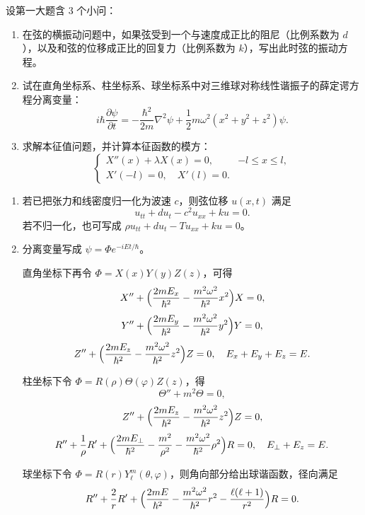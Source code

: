 ﻿

\begin{question}[简单计算和回答]

设第一大题含 3 个小问：
\begin{enumerate}[label=(\arabic*),leftmargin=2.6em,itemsep=0.25em,topsep=0.2em]
\item 在弦的横振动问题中，如果弦受到一个与速度成正比的阻尼（比例系数为 $d$），以及和弦的位移成正比的回复力（比例系数为 $k$），写出此时弦的振动方程。
\item 试在直角坐标系、柱坐标系、球坐标系中对三维球对称线性谐振子的薛定谔方程分离变量：
\[
 i\hbar\frac{\partial \psi}{\partial t}=-\frac{\hbar^2}{2m}\nabla^2\psi+\frac12 m\omega^2(x^2+y^2+z^2)\psi.
\]
\item 求解本征值问题，并计算本征函数的模方：
\[
\begin{cases}
X''(x)+\lambda X(x)=0, & -l\le x\le l,\\
X'(-l)=0,\quad X'(l)=0.
\end{cases}
\]
\end{enumerate}

\begin{solution}

\begin{enumerate}[label=(\arabic*),leftmargin=2.6em,itemsep=0.25em,topsep=0.2em]
\item 若已把张力和线密度归一化为波速 $c$，则弦位移 $u(x,t)$ 满足
\[
 u_{tt}+d u_t-c^2u_{xx}+ku=0.
\]
若不归一化，也可写成 $\rho u_{tt}+d u_t-Tu_{xx}+ku=0$。

\item 分离变量写成 $\psi=\Phi e^{-iEt/\hbar}$。

直角坐标下再令 $\Phi=X(x)Y(y)Z(z)$，可得
\[
X''+\Bigl(\frac{2mE_x}{\hbar^2}-\frac{m^2\omega^2}{\hbar^2}x^2\Bigr)X=0,
\]
\[
Y''+\Bigl(\frac{2mE_y}{\hbar^2}-\frac{m^2\omega^2}{\hbar^2}y^2\Bigr)Y=0,
\]
\[
Z''+\Bigl(\frac{2mE_z}{\hbar^2}-\frac{m^2\omega^2}{\hbar^2}z^2\Bigr)Z=0,
\quad E_x+E_y+E_z=E.
\]

柱坐标下令 $\Phi=R(\rho)\Theta(\varphi)Z(z)$，得
\[
\Theta''+m^2\Theta=0,
\]
\[
Z''+\Bigl(\frac{2mE_z}{\hbar^2}-\frac{m^2\omega^2}{\hbar^2}z^2\Bigr)Z=0,
\]
\[
R''+\frac1\rho R'+\Bigl(\frac{2mE_\perp}{\hbar^2}-\frac{m^2}{\rho^2}-\frac{m^2\omega^2}{\hbar^2}\rho^2\Bigr)R=0,
\quad E_\perp+E_z=E.
\]

球坐标下令 $\Phi=R(r)Y_{\ell}^{m}(\theta,\varphi)$，则角向部分给出球谐函数，径向满足
\[
R''+\frac{2}{r}R'+\Bigl(\frac{2mE}{\hbar^2}-\frac{m^2\omega^2}{\hbar^2}r^2-\frac{\ell(\ell+1)}{r^2}\Bigr)R=0.
\]


\end{enumerate}
\end{solution}
\end{question}
